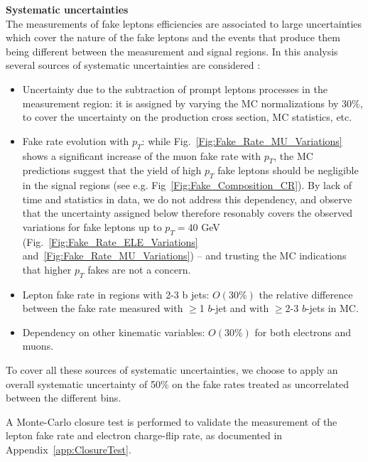 \par{\bf Systematic uncertainties\\}
The measurements of fake leptons efficiencies are associated to large uncertainties which cover the nature of the fake leptons 
and the events that produce them being different between the measurement and signal regions. 
In this analysis several sources of systematic uncertainties are considered : 
\begin{itemize}
	\item{Uncertainty due to the subtraction of prompt leptons processes in the measurement region: 
	it is assigned by varying the MC normalizations by 30$\%$, 
	to cover the uncertainty on the production cross section, MC statistics, etc.}
	\item{Fake rate evolution with $p_T$: while Fig.~\ref{Fig:Fake_Rate_MU_Variations} shows a significant increase of the muon fake rate with $p_T$, 
	the MC predictions suggest that the yield of high $p_T$ fake leptons should be negligible in the signal regions (see e.g. Fig~\ref{Fig:Fake_Composition_CR}). 
	By lack of time and statistics in data, we do not address this dependency, 
	and observe that the uncertainty assigned below therefore resonably covers the observed variations for fake leptons up to $p_T=40$ GeV 
	(Fig.~\ref{Fig:Fake_Rate_ELE_Variations} and~\ref{Fig:Fake_Rate_MU_Variations}) -- and trusting the MC indications that higher $p_T$ fakes are not a concern.}
	\item{Lepton fake rate in regions with 2-3 b jets: $O(30\%)$ the relative difference between the fake rate measured with $\geq$1 $b$-jet and with $\geq$2-3 $b$-jets in MC.}
	\item{Dependency on other kinematic variables: $O(30\%)$ for both electrons and muons.}	
\end{itemize}

To cover all these sources of systematic uncertainties, we choose to apply an overall systematic uncertainty of 50\% on the fake rates treated as uncorrelated between the different bins.

A Monte-Carlo closure test is performed to validate the measurement of the lepton fake rate and electron charge-flip rate, as documented in Appendix~\ref{app:ClosureTest}.
